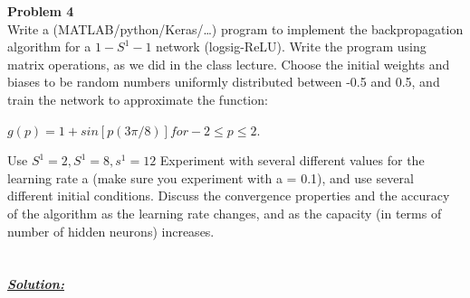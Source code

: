 \documentclass{article}
\begin{document}

\newpage
\noindent \textbf{Problem 4} \\

\noindent Write a (MATLAB/python/Keras/…) program to implement the backpropagation
algorithm for a $1-S^1-1$ network (logsig-ReLU). Write the program using matrix
operations, as we did in the class lecture. Choose the initial weights and biases to be
random numbers uniformly distributed between -0.5 and 0.5, and train the network to
approximate the function:
\begin{center}
  $ g(p)=1+sin[p(3 \pi /8)] for -2 \leq p \leq 2.$
\end{center}

\noindent Use $S^1=2, S^1=8, s^1=12$  Experiment with several different values for the learning
rate a (make sure you experiment with a = 0.1), and use several different initial conditions.
Discuss the convergence properties and the accuracy of the algorithm as the learning rate
changes, and as the capacity (in terms of number of hidden neurons) increases. \\ \\ \\

\noindent \underline{\textbf{\textit{Solution:}}} \\ 
\end{document}
